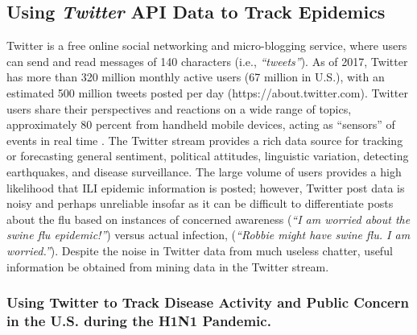 \documentclass[sigconf]{acmart}
\begin{document}
\subsection{Using {\itshape Twitter} API Data to Track Epidemics}

Twitter is a free online social networking and micro-blogging service, where users can send 
and read messages of 140 characters (i.e., {\it ``tweets''}). As of 2017, Twitter has more 
than 320 million monthly active users (67 million in U.S.), with an estimated 500 million 
tweets posted per day (https://about.twitter.com). Twitter users share their perspectives and
reactions on a wide range of topics, approximately 80 percent from handheld mobile devices, 
acting as ``sensors'' of events in real time \cite{achrekar12}. The Twitter stream provides 
a rich data source for tracking or forecasting general sentiment, political attitudes, 
linguistic variation, detecting earthquakes, and disease surveillance. The large volume of 
users provides a high likelihood that ILI epidemic information is posted; however, Twitter 
post data is noisy and perhaps unreliable insofar as it can be difficult to differentiate 
posts about the flu based on instances of concerned awareness ({\it ``I am worried about 
the swine flu epidemic!''}) versus actual infection, ({\it ``Robbie might have swine flu. 
I am worried.''})\cite{lamb13}. Despite the noise in Twitter data from much useless chatter, 
useful information be obtained from mining data in the Twitter stream. 

\subsubsection{Using Twitter to Track Disease Activity and Public Concern in the 
U.S. during the H1N1 Pandemic.}
\end{document}
